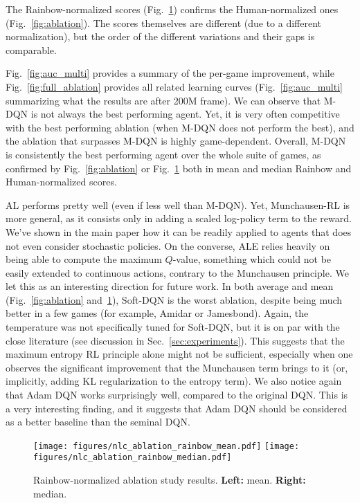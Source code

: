 \documentclass{article}
\begin{document}
The Rainbow-normalized scores (Fig.~\ref{fig:rainbow_ablation}) confirms the Human-normalized ones (Fig.~\ref{fig:ablation}). The scores themselves are different (due to a different normalization), but the order of the different variations and their gaps is comparable.

Fig.~\ref{fig:auc_multi} provides a summary of the per-game improvement, while Fig.~\ref{fig:full_ablation} provides all related learning curves (Fig.~\ref{fig:auc_multi} summarizing what the results are after 200M frame).
We can observe that M-DQN is not always the best performing agent. Yet, it is very often competitive with the best performing ablation (when M-DQN does not perform the best), and the ablation that surpasses M-DQN is highly game-dependent. Overall, M-DQN is consistently the best performing agent over the whole suite of games, as confirmed by Fig.~\ref{fig:ablation} or Fig.~\ref{fig:rainbow_ablation} both in mean and median Rainbow and Human-normalized scores.

AL performs pretty well (even if less well than M-DQN). Yet, Munchausen-RL is more general, as it consists only in adding a scaled log-policy term to the reward. We've shown in the main paper how it can be readily applied to agents that does not even consider stochastic policies. On the converse, ALE relies heavily on being able to compute the maximum $Q$-value, something which could not be easily extended to continuous actions, contrary to the Munchausen principle. We let this as an interesting direction for future work.
In both average and mean (Fig.~\ref{fig:ablation} and~\ref{fig:rainbow_ablation}), Soft-DQN is the worst ablation, despite being much better in a few games (for example, Amidar or Jamesbond). Again, the temperature was not specifically tuned for Soft-DQN, but it is on par with the close literature (see discussion in Sec.~\ref{sec:experiments}). This suggests that the maximum entropy RL principle alone might not be sufficient, especially when one observes the significant improvement that the Munchausen term brings to it (or, implicitly, adding KL regularization to the entropy term).
We also notice again that Adam DQN works surprisingly well, compared to the original DQN. This is a very interesting finding, and it suggests that Adam DQN should be considered as a better baseline than the seminal DQN.


\begin{figure}
    \centering
    \texttt{[image: figures/nlc\_ablation\_rainbow\_mean.pdf]}
    \texttt{[image: figures/nlc\_ablation\_rainbow\_median.pdf]}
    \caption{Rainbow-normalized ablation study results.  \textbf{Left:} mean. \textbf{Right:} median.}
    \label{fig:rainbow_ablation}
\end{figure}
\end{document}
